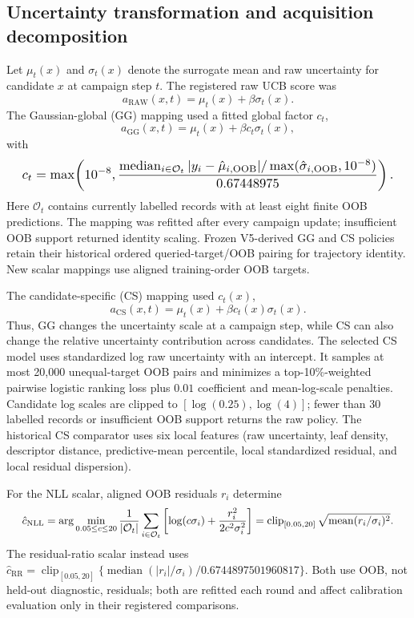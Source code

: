 \documentclass[10pt,twocolumn]{article}
\begin{document}
\subsection{Uncertainty transformation and acquisition decomposition}
Let $\mu_t(x)$ and $\sigma_t(x)$ denote the surrogate mean and raw uncertainty
for candidate $x$ at campaign step $t$. The registered raw UCB score was
\begin{equation}
a_{\mathrm{RAW}}(x,t)=\mu_t(x)+\beta\sigma_t(x).
\end{equation}
The Gaussian-global (GG) mapping used a fitted global factor $c_t$,
\begin{equation}
a_{\mathrm{GG}}(x,t)=\mu_t(x)+\beta c_t\sigma_t(x),
\end{equation}
with
\begin{equation}
\resizebox{.96\columnwidth}{!}{$\displaystyle c_t=\max\!\left(10^{-8},
\frac{\operatorname{median}_{i\in\mathcal O_t}
|y_i-\hat\mu_{i,\mathrm{OOB}}|/
\max(\hat\sigma_{i,\mathrm{OOB}},10^{-8})}
{0.67448975}\right).$}
\end{equation}
Here $\mathcal O_t$ contains currently labelled records with at least eight
finite OOB predictions. The mapping was refitted after every campaign update;
insufficient OOB support returned identity scaling. Frozen V5-derived GG and
CS policies retain their historical ordered queried-target/OOB pairing for
trajectory identity. New scalar mappings use aligned training-order OOB
targets.

The candidate-specific (CS) mapping used $c_t(x)$,
\begin{equation}
a_{\mathrm{CS}}(x,t)=\mu_t(x)+\beta c_t(x)\sigma_t(x).
\end{equation}
Thus, GG changes the uncertainty scale at a campaign step, while CS can also
change the relative uncertainty contribution across candidates. The selected
CS model uses standardized log raw uncertainty with an intercept. It samples
at most 20,000 unequal-target OOB pairs and minimizes a top-10\%-weighted
pairwise logistic ranking loss plus $0.01$ coefficient and mean-log-scale
penalties. Candidate log scales are clipped to
$[\log(0.25),\log(4)]$; fewer than 30 labelled records or insufficient OOB
support returns the raw policy. The historical CS comparator uses six local
features (raw uncertainty, leaf density, descriptor distance, predictive-mean
percentile, local standardized residual, and local residual dispersion).

For the NLL scalar, aligned OOB residuals $r_i$ determine
\begin{equation}
\resizebox{.96\columnwidth}{!}{$\displaystyle \hat c_{\mathrm{NLL}}=\arg\min_{0.05\le c\le20}
\frac{1}{|\mathcal O_t|}\sum_{i\in\mathcal O_t}
\left[\log(c\sigma_i)+\frac{r_i^2}{2c^2\sigma_i^2}\right]
=\operatorname{clip}_{[0.05,20]}
\sqrt{\operatorname{mean}(r_i/\sigma_i)^2}.$}
\end{equation}
The residual-ratio scalar instead uses
$\hat c_{\mathrm{RR}}=\operatorname{clip}_{[0.05,20]}
\{\operatorname{median}(|r_i|/\sigma_i)/0.6744897501960817\}$.
Both use OOB, not held-out diagnostic, residuals; both are refitted each round
and affect calibration evaluation only in their registered comparisons.
\end{document}
